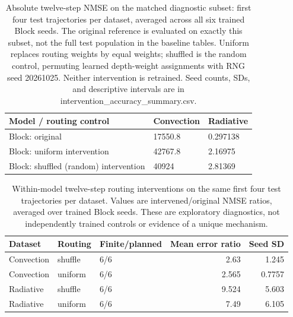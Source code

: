 \begin{table}[ht]\centering\small
\begin{tabular}{lll}
\toprule
Model / routing control & Convection & Radiative \\
\midrule
Block: original & 17550.8 & 0.297138 \\
Block: uniform intervention & 42767.8 & 2.16975 \\
Block: shuffled (random) intervention & 40924 & 2.81369 \\
\bottomrule
\end{tabular}
\caption{Absolute twelve-step NMSE on the matched diagnostic subset: first four test trajectories per dataset, averaged across all six trained Block seeds. The original reference is evaluated on exactly this subset, not the full test population in the baseline tables. Uniform replaces routing weights by equal weights; shuffled is the random control, permuting learned depth-weight assignments with RNG seed 20261025. Neither intervention is retrained. Seed counts, SDs, and descriptive intervals are in intervention\_accuracy\_summary.csv.}\end{table}
\begin{table}[ht]\centering\small
\begin{tabular}{lllrr}
\toprule
Dataset & Routing & Finite/planned & Mean error ratio & Seed SD \\
\midrule
Convection & shuffle & 6/6 & 2.63 & 1.245 \\
Convection & uniform & 6/6 & 2.565 & 0.7757 \\
Radiative & shuffle & 6/6 & 9.524 & 5.603 \\
Radiative & uniform & 6/6 & 7.49 & 6.105 \\
\bottomrule
\end{tabular}
\caption{Within-model twelve-step routing interventions on the same first four test trajectories per dataset. Values are intervened/original NMSE ratios, averaged over trained Block seeds. These are exploratory diagnostics, not independently trained controls or evidence of a unique mechanism.}\end{table}
